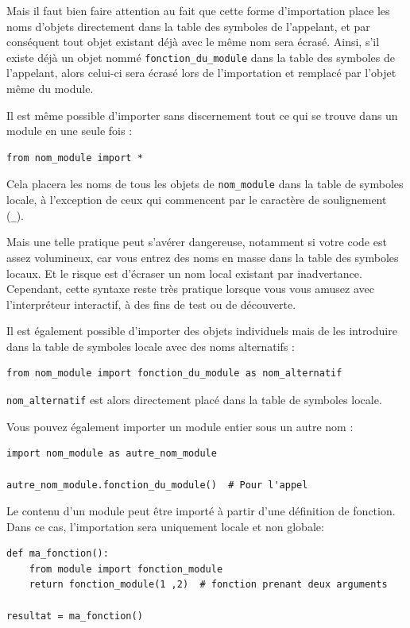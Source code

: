 \documentclass[a4paper,12pt]{book}
\begin{document}
Mais il faut bien faire attention au fait que cette forme d'importation place les noms d'objets directement dans la table des symboles de l'appelant, et par conséquent tout objet existant déjà avec le même nom sera écrasé. Ainsi, s'il existe déjà un objet nommé \texttt{fonction\_du\_module} dans la table des symboles de l'appelant, alors celui-ci sera écrasé lors de l'importation et remplacé par l'objet même du module.
\medskip

Il est même possible d'importer sans discernement tout ce qui se trouve dans un module en une seule fois :
\begin{lstlisting}[caption=Import de tous les objets du module]
from nom_module import *
\end{lstlisting}
\medskip

Cela placera les noms de tous les objets de \texttt{nom\_module} dans la table de symboles locale, à l'exception de ceux qui commencent par le caractère de soulignement (\texttt{\_}).
\medskip

Mais une telle pratique peut s'avérer dangereuse, notamment si votre code est assez volumineux, car vous entrez des noms en masse dans la table des symboles locaux. Et le risque est d'écraser un nom local existant par inadvertance. Cependant, cette syntaxe reste très pratique lorsque vous vous amusez avec l'interpréteur interactif, à des fins de test ou de découverte.
\medskip

Il est également possible d'importer des objets individuels mais de les introduire dans la table de symboles locale avec des noms alternatifs :
\begin{lstlisting}[caption=Import avec nom alternatif]
from nom_module import fonction_du_module as nom_alternatif
\end{lstlisting}
\medskip

\texttt{nom\_alternatif} est alors directement placé dans la table de symboles locale.
\medskip

Vous pouvez également importer un module entier sous un autre nom :
\begin{lstlisting}[caption=Import du module sous un autre nom]
import nom_module as autre_nom_module

autre_nom_module.fonction_du_module()  # Pour l'appel
\end{lstlisting}
\medskip

Le contenu d'un module peut être importé à partir d'une définition de fonction. Dans ce cas, l'importation sera uniquement locale et non globale:
\begin{lstlisting}[caption=Importation d'un module dans une fonction]
def ma_fonction():
    from module import fonction_module
    return fonction_module(1 ,2)  # fonction prenant deux arguments

resultat = ma_fonction()
\end{lstlisting}
\medskip
\end{document}
